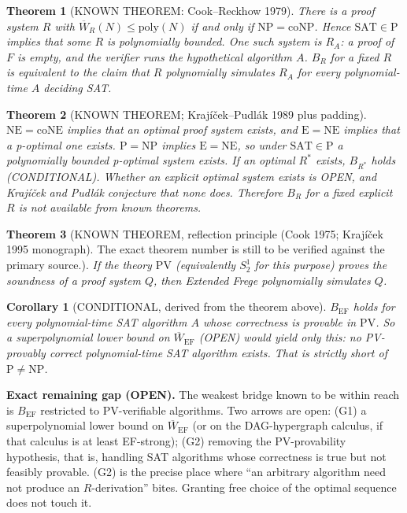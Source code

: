 \documentclass[11pt]{article}
\newtheorem{theorem}{Theorem}\newtheorem{corollary}{Corollary}\newtheorem{definition}{Definition}
\begin{document}
\begin{theorem}[KNOWN THEOREM: Cook--Reckhow 1979]
There is a proof system $R$ with $\overline W_R(N)\le\mathrm{poly}(N)$ if and only if $\mathrm{NP}=\mathrm{coNP}$. Hence $\mathrm{SAT}\in\mathrm P$ implies that \emph{some} $R$ is polynomially bounded. One such system is $R_A$: a proof of $F$ is empty, and the verifier runs the hypothetical algorithm $A$. $B_R$ for a \emph{fixed} $R$ is equivalent to the claim that $R$ polynomially simulates $R_A$ for every polynomial-time $A$ deciding SAT.
\end{theorem}

\begin{theorem}[KNOWN THEOREM; Krajíček--Pudlák 1989 plus padding]
$\mathrm{NE}=\mathrm{coNE}$ implies that an optimal proof system exists, and $\mathrm E=\mathrm{NE}$ implies that a p-optimal one exists. $\mathrm P=\mathrm{NP}$ implies $\mathrm E=\mathrm{NE}$, so under $\mathrm{SAT}\in\mathrm P$ a polynomially bounded p-optimal system exists. If an optimal $R^\ast$ exists, $B_{R^\ast}$ holds (CONDITIONAL). Whether an explicit optimal system exists is OPEN, and Krajíček and Pudlák conjecture that none does. Therefore $B_R$ for a fixed explicit $R$ is not available from known theorems.
\end{theorem}

\begin{theorem}[KNOWN THEOREM, reflection principle (Cook 1975; Krajíček 1995 monograph). The exact theorem number is still to be verified against the primary source.]
If the theory $\mathrm{PV}$ (equivalently $S^1_2$ for this purpose) proves the soundness of a proof system $Q$, then Extended Frege polynomially simulates $Q$.
\end{theorem}
\begin{corollary}[CONDITIONAL, derived from the theorem above]\label{c:pv}
$B_{\mathrm{EF}}$ holds for every polynomial-time SAT algorithm $A$ whose correctness is provable in $\mathrm{PV}$. So a superpolynomial lower bound on $\overline W_{\mathrm{EF}}$ (OPEN) would yield only this: \emph{no PV-provably correct polynomial-time SAT algorithm exists.} That is strictly short of $\mathrm P\ne\mathrm{NP}$.
\end{corollary}
\noindent\textbf{Exact remaining gap (OPEN).} The weakest bridge known to be within reach is $B_{\mathrm{EF}}$ restricted to PV-verifiable algorithms. Two arrows are open:
(G1) a superpolynomial lower bound on $\overline W_{\mathrm{EF}}$ (or on the DAG-hypergraph calculus, if that calculus is at least EF-strong);
(G2) removing the PV-provability hypothesis, that is, handling SAT algorithms whose correctness is true but not feasibly provable.
(G2) is the precise place where ``an arbitrary algorithm need not produce an $R$-derivation'' bites. Granting free choice of the optimal sequence does not touch it.
\end{document}
